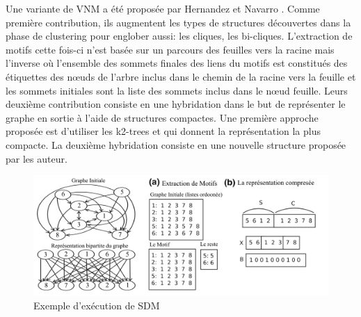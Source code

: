 \newpage	
	Une variante de VNM a été proposée par Hernandez et Navarro \citep{hernandez2014compressed}. Comme première contribution, ils augmentent les types de structures découvertes dans la phase de clustering pour englober aussi: les cliques, les bi-cliques. L'extraction de motifs cette fois-ci n'est basée sur un parcours des feuilles vers la racine mais l'inverse où  l'ensemble des sommets finales des liens du motifs est constitués des étiquettes des nœuds de l'arbre inclus dans le chemin de la racine vers la feuille et  les sommets initiales sont la liste des sommets inclus dans le nœud feuille. 
				Leurs deuxième contribution consiste en une hybridation dans le but de représenter le graphe en sortie à l'aide de structures compactes. Une première approche proposée est d'utiliser les  k2-trees \citep{brisaboa2009k} et qui donnent la représentation la plus compacte.  
				La deuxième hybridation consiste en une nouvelle structure proposée par les auteur.\\
				\begin{center}
				\begin{figure}[h]
					\includegraphics[scale=0.23]{ressources/image/VNM2_exemple.png} 
					\caption{Exemple d'exécution de SDM}
					\label{SDM}
				\end{figure}
				\end{center}
				